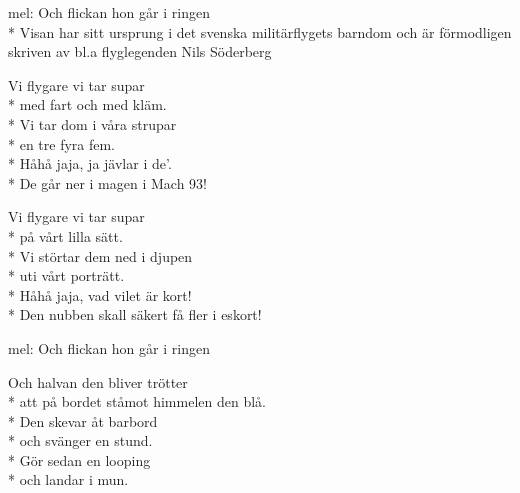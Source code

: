 \begin{SongText}[Flygarsupen]
    \begin{SongInfo}
        mel: Och flickan hon går i ringen\\*%
        Visan har sitt ursprung i det svenska militärflygets barndom och är förmodligen skriven av bl.a flyglegenden Nils Söderberg
    \end{SongInfo}
    \begin{Verse}
        Vi flygare vi tar supar\\*%
        med fart och med kläm.\\*%
        Vi tar dom i våra strupar\\*%
        en tre fyra fem.\\*%
        Håhå jaja, ja jävlar i de'.\\*%
        De går ner i magen i Mach 93!
    \end{Verse}
    \begin{Verse}
        Vi flygare vi tar supar\\*%
        på vårt lilla sätt.\\*%
        Vi störtar dem ned i djupen\\*%
        uti vårt porträtt.\\*%
        Håhå jaja, vad vilet är kort!\\*%
        Den nubben skall säkert få fler i eskort!
    \end{Verse}
\end{SongText}
\begin{SongText}[Flygarhalvan]
    \begin{SongInfo}
        mel: Och flickan hon går i ringen
    \end{SongInfo}
    \begin{Verse}
        Och halvan den bliver trötter\\*%
        att på bordet ståmot himmelen den blå.\\*%
        Den skevar åt barbord\\*%
        och svänger en stund.\\*%
        Gör sedan en looping\\*%
        och landar i mun.
    \end{Verse}
\end{SongText}

